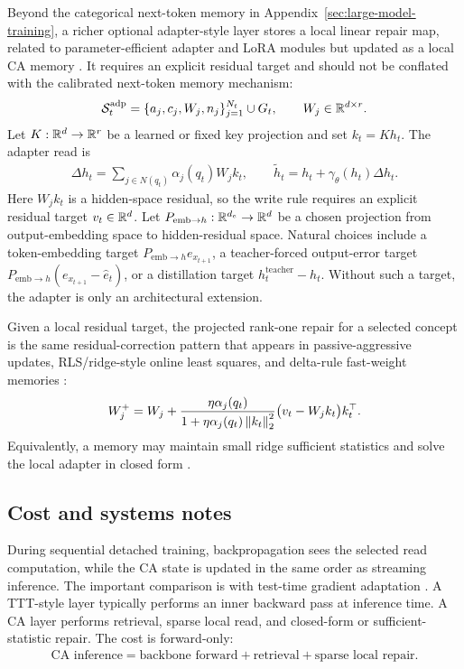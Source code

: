 Beyond the categorical next-token memory in Appendix~\ref{sec:large-model-training}, a richer optional adapter-style layer stores a local linear repair map, related to parameter-efficient adapter and LoRA modules but updated as a local CA memory \citep{houlsby2019parameter,hu2022lora}. It requires an explicit residual target and should not be conflated with the calibrated next-token memory mechanism:
\begin{align*}
\mathcal{S}_t^{\mathrm{adp}}=\{a_j,c_j,W_j,n_j\}_{j=1}^{N_t}\cup G_t,
\qquad
W_j\in\mathbb{R}^{d\times r}.
\end{align*}
Let $K:\mathbb{R}^d\to\mathbb{R}^r$ be a learned or fixed key projection and set $k_t=Kh_t$. The adapter read is
\begin{align*}
\Delta h_t=\sum_{j\in N(q_t)}\alpha_j(q_t)W_jk_t,
\qquad
\tilde h_t=h_t+\gamma_\theta(h_t)\Delta h_t.
\end{align*}
Here $W_jk_t$ is a hidden-space residual, so the write rule requires an explicit residual target $v_t\in\mathbb{R}^d$. Let $P_{\mathrm{emb}\to h}:\mathbb{R}^{d_e}\to\mathbb{R}^d$ be a chosen projection from output-embedding space to hidden-residual space. Natural choices include a token-embedding target $P_{\mathrm{emb}\to h}e_{x_{t+1}}$, a teacher-forced output-error target $P_{\mathrm{emb}\to h}(e_{x_{t+1}}-\hat e_t)$, or a distillation target $h_t^{\mathrm{teacher}}-h_t$. Without such a target, the adapter is only an architectural extension.

Given a local residual target, the projected rank-one repair for a selected concept is the same residual-correction pattern that appears in passive-aggressive updates, RLS/ridge-style online least squares, and delta-rule fast-weight memories \citep{crammer2006online,vovk1997competitive,schlag2021linear}:
\begin{align*}
W_j^+=W_j+
\frac{\eta\alpha_j(q_t)}
{1+\eta\alpha_j(q_t)\left\lVert k_t\right\rVert_2^2}
\big(v_t-W_jk_t\big)k_t^\top.
\end{align*}
Equivalently, a memory may maintain small ridge sufficient statistics and solve the local adapter in closed form \citep{tikhonov1977solutions,hoerl1970ridge}.

\subsection{Cost and systems notes}

During sequential detached training, backpropagation sees the selected read computation, while the CA state is updated in the same order as streaming inference. The important comparison is with test-time gradient adaptation \citep{sun2020test,wang2021tent,niu2022eata,zhang2022memo,sun2025learning}. A TTT-style layer typically performs an inner backward pass at inference time. A CA layer performs retrieval, sparse local read, and closed-form or sufficient-statistic repair. The cost is forward-only:
\begin{align*}
\text{CA inference}=\text{backbone forward}+\text{retrieval}+\text{sparse local repair}.
\end{align*}

